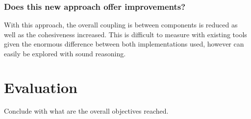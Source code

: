 \subsection{Does this new approach offer improvements?}

With this approach, the overall coupling is between components is reduced as well as the cohesiveness increased. This is difficult to measure with existing tools given the enormous difference between both implementations used, however can easily be explored with sound reasoning. 

\chapter{Evaluation}

Conclude with what are the overall objectives reached. 